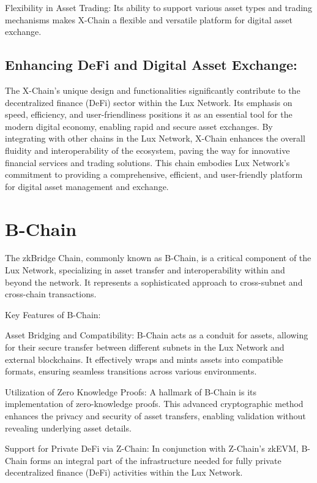 \documentclass[11pt]{article}
\begin{document}
Flexibility in Asset Trading: Its ability to support various asset types and trading mechanisms makes X-Chain a flexible and versatile platform for digital asset exchange.


\subsection{Enhancing DeFi and Digital Asset Exchange:}

The X-Chain's unique design and functionalities significantly contribute to the decentralized finance (DeFi) sector within the Lux Network. Its emphasis on speed, efficiency, and user-friendliness positions it as an essential tool for the modern digital economy, enabling rapid and secure asset exchanges. By integrating with other chains in the Lux Network, X-Chain enhances the overall fluidity and interoperability of the ecosystem, paving the way for innovative financial services and trading solutions. This chain embodies Lux Network's commitment to providing a comprehensive, efficient, and user-friendly platform for digital asset management and exchange.


\section{B-Chain}

The zkBridge Chain, commonly known as B-Chain, is a critical component of the Lux Network, specializing in asset transfer and interoperability within and beyond the network. It represents a sophisticated approach to cross-subnet and cross-chain transactions.


Key Features of B-Chain:


Asset Bridging and Compatibility: B-Chain acts as a conduit for assets, allowing for their secure transfer between different subnets in the Lux Network and external blockchains. It effectively wraps and mints assets into compatible formats, ensuring seamless transitions across various environments.


Utilization of Zero Knowledge Proofs: A hallmark of B-Chain is its implementation of zero-knowledge proofs. This advanced cryptographic method enhances the privacy and security of asset transfers, enabling validation without revealing underlying asset details.


Support for Private DeFi via Z-Chain: In conjunction with Z-Chain's zkEVM, B-Chain forms an integral part of the infrastructure needed for fully private decentralized finance (DeFi) activities within the Lux Network.
\end{document}
